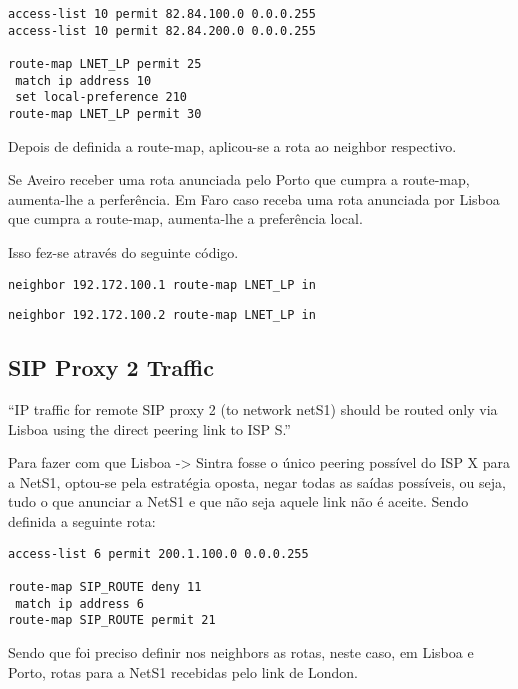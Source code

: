 \documentclass[11pt,a4paper]{report}
\begin{document}
\begin{lstlisting}[caption=Route-map para a netL1 e netL2]
access-list 10 permit 82.84.100.0 0.0.0.255
access-list 10 permit 82.84.200.0 0.0.0.255

route-map LNET_LP permit 25
 match ip address 10
 set local-preference 210
route-map LNET_LP permit 30
\end{lstlisting}

Depois de definida a route-map, aplicou-se a rota ao neighbor respectivo.

Se Aveiro receber uma rota anunciada pelo Porto que cumpra a route-map, aumenta-lhe a perferência. Em Faro caso receba uma rota anunciada por Lisboa que cumpra a route-map, aumenta-lhe a preferência local.

Isso fez-se através do seguinte código.\\
\begin{lstlisting}[caption=Route-map LNET\_LP no Neighbor Porto no Router de Aveiro]
  neighbor 192.172.100.1 route-map LNET_LP in
\end{lstlisting}

\begin{lstlisting}[caption=Route-map LNET\_LP no Neighbor Lisboa no Router de Faro]
  neighbor 192.172.100.2 route-map LNET_LP in
\end{lstlisting}

\subsection{SIP Proxy 2 Traffic}

``IP traffic for remote SIP proxy 2 (to network netS1) should be routed only via Lisboa using the direct peering link to ISP S.''
\newline

Para fazer com que Lisboa -> Sintra fosse o único peering possível do ISP X para a NetS1, optou-se pela estratégia oposta, negar todas as saídas possíveis, ou seja, tudo o que anunciar a NetS1 e que não seja aquele link não é aceite. Sendo definida a seguinte rota:\\

\begin{lstlisting}[caption=Route-map SIP\_ROUTE para cancelar rotas]
access-list 6 permit 200.1.100.0 0.0.0.255

route-map SIP_ROUTE deny 11
 match ip address 6
route-map SIP_ROUTE permit 21
\end{lstlisting}

Sendo que foi preciso definir nos neighbors as rotas, neste caso, em Lisboa e Porto, rotas para a NetS1 recebidas pelo link de London.\\
\end{document}

